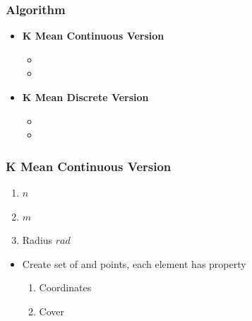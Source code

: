 \documentclass[blue]{beamer}
\begin{document}
\begin{frame}
 \frametitle{Algorithm}
  {}
  \begin{itemize}
    \item {\textbf{K Mean Continuous Version}}
      \begin{itemize}
         \item {\color{blue}{It is similar to standard K Mean algorithm}} 
         \item {\color{blue}{Continuous Case}}
      \end{itemize}
    \item {\textbf{K Mean Discrete Version}}
      \begin{itemize}
        \item {\color{blue}{Modified K Mean Algorithm}} 
         \item {\color{blue}{Discrete Case}}
       \end{itemize}
   \end{itemize}
\end{frame}
\begin{frame}
 \frametitle{K Mean Continuous Version}
 {}
  \begin{enumerate}
      \item $n$ {\color{red}{Red Points}}
      \item $m$ {\color{blue}{Blue Points}}
      \item Radius $rad$ 
  \end{enumerate}
 {}
 \begin{itemize}
  \item Create set of {\color{red}{red}} and {\color{blue}{blue}} points, each element has property 
   \begin{enumerate}
    \item Coordinates
    \item Cover
  \end{enumerate}
 \end{itemize}
\end{frame}
\end{document}
